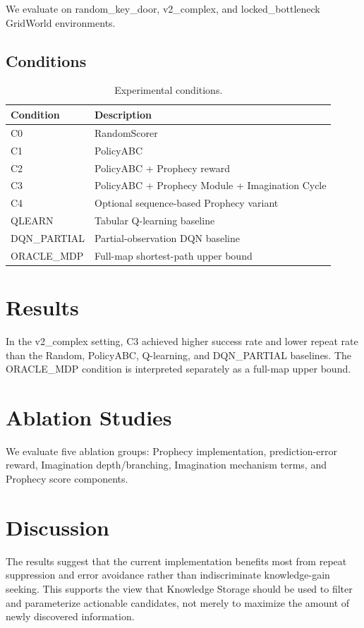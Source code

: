 \documentclass[conference]{IEEEtran}
\begin{document}
We evaluate on random\_key\_door, v2\_complex, and locked\_bottleneck
GridWorld environments.

\subsection{Conditions}

\begin{table}[h]
\centering
\caption{Experimental conditions.}
\begin{tabular}{ll}
\toprule
Condition & Description \\
\midrule
C0 & RandomScorer \\
C1 & PolicyABC \\
C2 & PolicyABC + Prophecy reward \\
C3 & PolicyABC + Prophecy Module + Imagination Cycle \\
C4 & Optional sequence-based Prophecy variant \\
QLEARN & Tabular Q-learning baseline \\
DQN\_PARTIAL & Partial-observation DQN baseline \\
ORACLE\_MDP & Full-map shortest-path upper bound \\
\bottomrule
\end{tabular}
\end{table}

\section{Results}

In the v2\_complex setting, C3 achieved higher success rate and lower repeat
rate than the Random, PolicyABC, Q-learning, and DQN\_PARTIAL baselines. The
ORACLE\_MDP condition is interpreted separately as a full-map upper bound.

\section{Ablation Studies}

We evaluate five ablation groups: Prophecy implementation, prediction-error
reward, Imagination depth/branching, Imagination mechanism terms, and Prophecy
score components.

\section{Discussion}

The results suggest that the current implementation benefits most from repeat
suppression and error avoidance rather than indiscriminate knowledge-gain
seeking. This supports the view that Knowledge Storage should be used to filter
and parameterize actionable candidates, not merely to maximize the amount of
newly discovered information.
\end{document}
